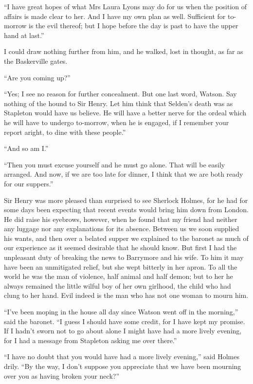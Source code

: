 \documentclass[paper=5.5in:8.5in,BCOR=7mm,twoside,DIV=calc,12pt,usegeometry,openany,chapterprefix,endperiod]{scrbook} %
\begin{document}
\enquote{I have great hopes of what Mrs Laura Lyons may do for us when the position of affairs is made clear to her. And I have my own plan as well. Sufficient for to-morrow is the evil thereof; but I hope before the day is past to have the upper hand at last.}

I could draw nothing further from him, and he walked, lost in thought, as far as the Baskerville gates.

\enquote{Are you coming up?}

\enquote{Yes; I see no reason for further concealment. But one last word, Watson. Say nothing of the hound to Sir Henry. Let him think that Selden's death was as Stapleton would have us believe. He will have a better nerve for the ordeal which he will have to undergo to-morrow, when he is engaged, if I remember your report aright, to dine with these people.}

\enquote{And so am I.}

\enquote{Then you must excuse yourself and he must go alone. That will be easily arranged. And now, if we are too late for dinner, I think that we are both ready for our suppers.}

Sir Henry was more pleased than surprised to see Sherlock \newline Holmes, for he had for some days been expecting that recent events would bring him down from London. He did raise his eyebrows, however, when he found that my friend had neither any luggage nor any explanations for its absence. Between us we soon supplied his wants, and then over a belated supper we explained to the baronet as much of our experience as it seemed desirable that he should know. But first I had the unpleasant duty of breaking the news to Barrymore and his wife. To him it may have been an unmitigated relief, but she wept bitterly in her apron. To all the world he was the man of violence, half animal and half demon; but to her he always remained the little wilful boy of her own girlhood, the child who had clung to her hand. Evil indeed is the man who has not one woman to mourn him.

\enquote{I've been moping in the house all day since Watson went off in the morning,} said the baronet. \enquote{I guess I should have some credit, for I have kept my promise. If I hadn't sworn not to go about alone I might have had a more lively evening, for I had a message from Stapleton asking me over there.}

\enquote{I have no doubt that you would have had a more lively evening,} said Holmes drily. \enquote{By the way, I don't suppose you appreciate that we have been mourning over you as having broken your neck?}
\end{document}
